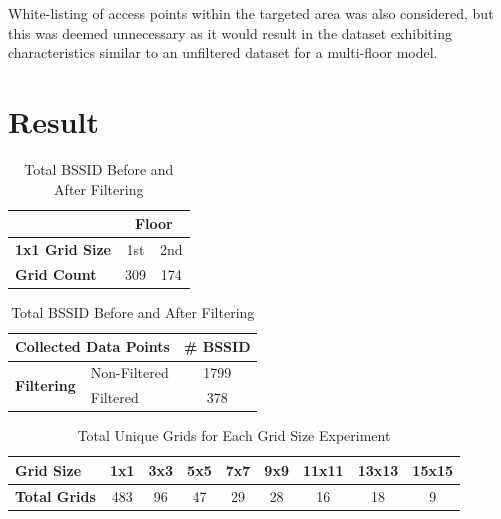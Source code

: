 \documentclass[runningheads]{llncs}
\begin{document}
White-listing of access points within the targeted area was also considered, but this was deemed unnecessary as it would result in the dataset exhibiting characteristics similar to an unfiltered dataset for a multi-floor model.


\section{Result}
\begin{table}[htbp]
	\centering
	\begin{minipage}{0.42\textwidth}
		\centering
		\caption{Total True Unique Grids by Floor}
		\label{tab:true_unique_grid}
		\vspace{2pt}
		\small
		\begin{tabular}{|l|c|c|} 
			\hline
			& \multicolumn{2}{c|}{\textbf{Floor}}  \\ 
			\hline
			\textbf{1x1 Grid Size} & 1st & 2nd \\ 
			\hline
			\textbf{Grid Count} & 309 & 174 \\
			\hline
		\end{tabular}
	\end{minipage}
	\hfill
	\begin{minipage}{0.52\textwidth}
		\centering
		\caption{Total BSSID Before and After Filtering}
		\label{tab:bssid_counts}
		\vspace{2pt}
		\small
		\begin{tabular}{|l|l|c|}
			\hline
			\multicolumn{2}{|l|}{\textbf{Collected Data Points}} & \textbf{\# BSSID} \\
			\hline
			\multirow{2}{*}{\textbf{Filtering}} & Non-Filtered & 1799 \\
			\cline{2-3}
			& Filtered & 378 \\
			\hline
		\end{tabular}
	\end{minipage}
\end{table}
\vspace{-15pt}
\begin{table}[htbp]
	\caption{Total Unique Grids for Each Grid Size Experiment}
	\label{tab:grid_size_variations}
	\vspace{2pt}
	\centering
	\small
	\begin{tabular}{|l|c|c|c|c|c|c|c|c|} 
		\hline
		\textbf{Grid Size} & 1x1 & 3x3 & 5x5 & 7x7 & 9x9 & 11x11 & 13x13 & 15x15 \\ 
		\hline
		\textbf{Total Grids} & 483 & 96 & 47 & 29 & 28 & 16 & 18 & 9 \\
		\hline
	\end{tabular}
\end{table}
\vspace{-10pt}
\end{document}
